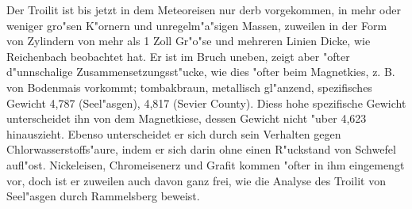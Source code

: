 \documentclass[a4paper, 11pt, oneside]{article}
\begin{document}
Der Troilit ist bis jetzt in dem Meteoreisen nur derb vorgekommen, in mehr oder weniger gro"sen K"ornern und unregelm"a"sigen Massen, zuweilen in der Form von Zylindern von mehr als 1 Zoll Gr"o"se und mehreren Linien Dicke, wie Reichenbach beobachtet hat. Er ist im Bruch uneben, zeigt aber "ofter d"unnschalige Zusammensetzungsst"ucke, wie dies "ofter beim Magnetkies, z. B. von Bodenmais vorkommt; tombakbraun, metallisch gl"anzend, spezifisches Gewicht 4,787 (Seel"asgen), 4,817 (Sevier County). Diess hohe spezifische Gewicht unterscheidet ihn von dem Magnetkiese, dessen Gewicht nicht "uber 4,623 hinauszieht. Ebenso unterscheidet er sich durch sein Verhalten gegen Chlorwasserstoffs"aure, indem er sich darin ohne einen R"uckstand von Schwefel aufl"ost. Nickeleisen, Chromeisenerz und Grafit kommen "ofter in ihm eingemengt vor, doch ist er zuweilen auch davon ganz frei, wie die Analyse des Troilit von Seel"asgen durch Rammelsberg beweist.
\end{document}
